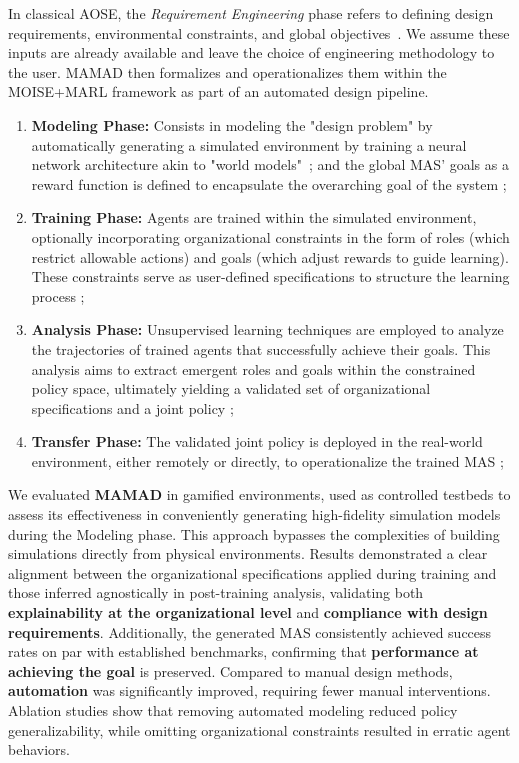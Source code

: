 \documentclass[pdflatex,sn-mathphys-num]{sn-jnl}%
\theoremstyle{thmstyleone}%
\theoremstyle{thmstyletwo}%
\theoremstyle{thmstylethree}%
\begin{document}
In classical AOSE, the \textit{Requirement Engineering} phase refers to defining design requirements, environmental constraints, and global objectives~\cite{Pavon2003, Bernon2005}. We assume these inputs are already available and leave the choice of engineering methodology to the user. MAMAD then formalizes and operationalizes them within the MOISE+MARL framework as part of an automated design pipeline.

\begin{enumerate}
  \item \textbf{Modeling Phase:} Consists in modeling the "design problem" by automatically generating a simulated environment by training a neural network architecture akin to "world models"~\cite{Ha2018}; and the global MAS' goals as a reward function is defined to encapsulate the overarching goal of the system ;
  \item \textbf{Training Phase:} Agents are trained within the simulated environment, optionally incorporating organizational constraints in the form of roles (which restrict allowable actions) and goals (which adjust rewards to guide learning). These constraints serve as user-defined specifications to structure the learning process ;
  \item \textbf{Analysis Phase:} Unsupervised learning techniques are employed to analyze the trajectories of trained agents that successfully achieve their goals. This analysis aims to extract emergent roles and goals within the constrained policy space, ultimately yielding a validated set of organizational specifications and a joint policy ;
  \item \textbf{Transfer Phase:} The validated joint policy is deployed in the real-world environment, either remotely or directly, to operationalize the trained MAS ;
\end{enumerate}

We evaluated \textbf{MAMAD} in gamified environments, used as controlled testbeds to assess its effectiveness in conveniently generating high-fidelity simulation models during the Modeling phase. This approach bypasses the complexities of building simulations directly from physical environments.
Results demonstrated a clear alignment between the organizational specifications applied during training and those inferred agnostically in post-training analysis, validating both \textbf{explainability at the organizational level} and \textbf{compliance with design requirements}. Additionally, the generated MAS consistently achieved success rates on par with established benchmarks, confirming that \textbf{performance at achieving the goal} is preserved. Compared to manual design methods, \textbf{automation} was significantly improved, requiring fewer manual interventions. Ablation studies show that removing automated modeling reduced policy generalizability, while omitting organizational constraints resulted in erratic agent behaviors.
\end{document}
